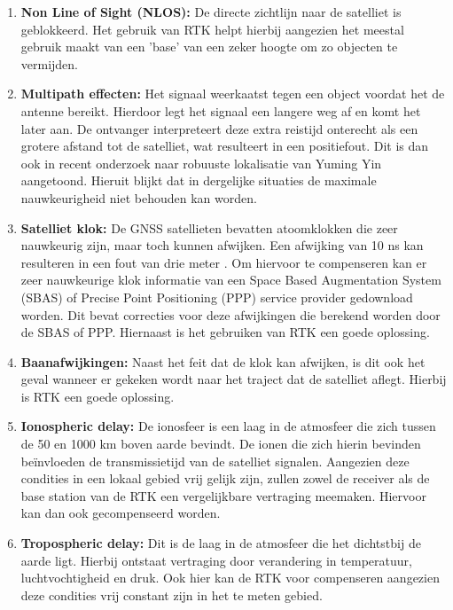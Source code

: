 \begin{enumerate}
	\item \textbf{Non Line of Sight (NLOS):} De directe zichtlijn naar de satelliet is geblokkeerd. Het gebruik van RTK helpt hierbij aangezien het meestal gebruik maakt van een 'base' van een zeker hoogte om zo objecten te vermijden.
	\item \textbf{Multipath effecten:} Het signaal weerkaatst tegen een object voordat het de antenne bereikt. Hierdoor legt het signaal een langere weg af en komt het later aan. De ontvanger interpreteert deze extra reistijd onterecht als een grotere afstand tot de satelliet, wat resulteert in een positiefout. Dit is dan ook in recent onderzoek naar robuuste lokalisatie van Yuming Yin \cite{pmc_sensorfusion} aangetoond. Hieruit blijkt dat in dergelijke situaties de maximale nauwkeurigheid niet behouden kan worden.
	\item \textbf{Satelliet klok:} De GNSS satellieten bevatten atoomklokken die zeer nauwkeurig zijn, maar toch kunnen afwijken. Een afwijking van 10 ns kan resulteren in een fout van drie meter \cite{NovAtelGNSSerrorSources2026}. Om hiervoor te compenseren kan er zeer nauwkeurige klok informatie van een Space Based Augmentation System (SBAS) of Precise Point Positioning (PPP) service provider gedownload worden. Dit bevat correcties voor deze afwijkingen die berekend worden door de SBAS of PPP. Hiernaast is het gebruiken van RTK een goede oplossing.
	\item \textbf{Baanafwijkingen:} Naast het feit dat de klok kan afwijken, is dit ook het geval wanneer er gekeken wordt naar het traject dat de satelliet aflegt. Hierbij is RTK een goede oplossing.
	\item \textbf{Ionospheric delay:} De ionosfeer is een laag in de atmosfeer die zich tussen de 50 en 1000 km boven aarde bevindt. De ionen die zich hierin bevinden beïnvloeden de transmissietijd van de satelliet signalen. Aangezien deze condities in een lokaal gebied vrij gelijk zijn, zullen zowel de receiver als de base station van de RTK een vergelijkbare vertraging meemaken. Hiervoor kan dan ook gecompenseerd worden.
	\item \textbf{Tropospheric delay:} Dit is de laag in de atmosfeer die het dichtstbij de aarde ligt. Hierbij ontstaat vertraging door verandering in temperatuur, luchtvochtigheid en druk. Ook hier kan de RTK voor compenseren aangezien deze condities vrij constant zijn in het te meten gebied.
\end{enumerate}

